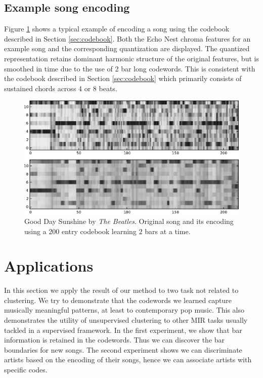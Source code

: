 \documentclass{article}
\begin{document}
\subsection{Example song encoding}

Figure \ref{fig:encodesong} shows a typical example of encoding a song
using the codebook described in Section \ref{sec:codebook}.  Both the
Echo Nest chroma features for an example song and the corresponding
quantization are displayed.  The quantized representation retains
dominant harmonic structure of the original features, but is smoothed
in time due to the use of 2 bar long codewords.
%
This is consistent with the codebook described in Section
\ref{sec:codebook} which primarily consists of sustained chords across
4 or 8 beats.

\begin{figure}[htb]
\begin{center}
\includegraphics[width=.9\columnwidth]{song_encoded}
\end{center}
\caption{\small{Good Day Sunshine by \textit{The Beatles}.
Original song and its encoding using a $200$ entry codebook learning
$2$ bars at a time.
}}
\label{fig:encodesong}
\end{figure}


\section{Applications}\label{sec:exps2}
In this section we apply the result of our method to two task
not related to clustering. We try to demonstrate that the codewords
we learned capture musically meaningful patterns, at least to
contemporary pop music. This also demonstrates the utility of unsupervised 
clustering to other MIR tasks usually tackled in a supervised
framework. In the first experiment, we show that bar information is retained 
in the codewords. Thus we can discover the bar boundaries for new songs.
The second experiment shows we can discriminate artists
based on the encoding of their songs, hence we can associate artists
with specific codes.
\end{document}
